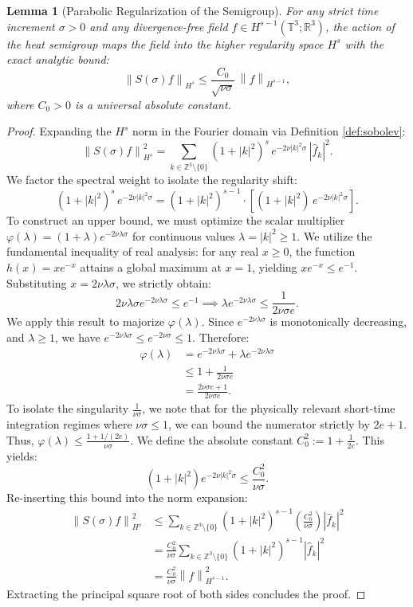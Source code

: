\documentclass[12pt,a4paper]{article}
\theoremstyle{plain}
\newtheorem{lemma}[theorem]{Lemma}
\theoremstyle{definition}
\theoremstyle{remark}
\newcommand{\T}{\mathbb{T}}
\newcommand{\Z}{\mathbb{Z}}
\newcommand{\R}{\mathbb{R}}
\newcommand{\norm}[1]{\left\|#1\right\|}
\begin{document}
\begin{lemma}[Parabolic Regularization of the Semigroup]
\label{lem:regul}
For any strict time increment $\sigma > 0$ and any divergence-free field $f\in H^{s-1}(\T^3;\R^3)$, the action of the heat semigroup maps the field into the higher regularity space $H^s$ with the exact analytic bound:
\[
  \norm{S(\sigma)f}_{H^s} \le \frac{C_0}{\sqrt{\nu\sigma}}\,\norm{f}_{H^{s-1}},
\]
where $C_0 > 0$ is a universal absolute constant.
\end{lemma}

\begin{proof}
Expanding the $H^s$ norm in the Fourier domain via Definition \ref{def:sobolev}:
\[
  \norm{S(\sigma)f}_{H^s}^2 = \sum_{k\in\Z^3\setminus\{0\}} (1+|k|^2)^s\,e^{-2\nu|k|^2\sigma}\,|\hat{f}_k|^2.
\]
We factor the spectral weight to isolate the regularity shift:
\[
  (1+|k|^2)^s\,e^{-2\nu|k|^2\sigma} = (1+|k|^2)^{s-1} \cdot \left[ (1+|k|^2)\,e^{-2\nu|k|^2\sigma} \right].
\]
To construct an upper bound, we must optimize the scalar multiplier $\varphi(\lambda) = (1+\lambda)e^{-2\nu\lambda\sigma}$ for continuous values $\lambda = |k|^2 \ge 1$.
We utilize the fundamental inequality of real analysis: for any real $x \ge 0$, the function $h(x) = x e^{-x}$ attains a global maximum at $x=1$, yielding $x e^{-x} \le e^{-1}$.
Substituting $x = 2\nu\lambda\sigma$, we strictly obtain:
\[
  2\nu\lambda\sigma e^{-2\nu\lambda\sigma} \le e^{-1} \implies \lambda e^{-2\nu\lambda\sigma} \le \frac{1}{2\nu\sigma e}.
\]
We apply this result to majorize $\varphi(\lambda)$. Since $e^{-2\nu\lambda\sigma}$ is monotonically decreasing, and $\lambda \ge 1$, we have $e^{-2\nu\lambda\sigma} \le e^{-2\nu\sigma} \le 1$. Therefore:
\begin{align*}
  \varphi(\lambda) &= e^{-2\nu\lambda\sigma} + \lambda e^{-2\nu\lambda\sigma} \\
  &\le 1 + \frac{1}{2\nu\sigma e} \\
  &= \frac{2\nu\sigma e + 1}{2\nu\sigma e}.
\end{align*}
To isolate the singularity $\frac{1}{\nu\sigma}$, we note that for the physically relevant short-time integration regimes where $\nu\sigma \le 1$, we can bound the numerator strictly by $2e + 1$. Thus, $\varphi(\lambda) \le \frac{1 + 1/(2e)}{\nu\sigma}$. We define the absolute constant $C_0^2 := 1 + \frac{1}{2e}$. This yields:
\[
  (1+|k|^2)e^{-2\nu|k|^2\sigma} \le \frac{C_0^2}{\nu\sigma}.
\]
Re-inserting this bound into the norm expansion:
\begin{align*}
  \norm{S(\sigma)f}_{H^s}^2
  &\le \sum_{k\in\Z^3\setminus\{0\}} (1+|k|^2)^{s-1} \left( \frac{C_0^2}{\nu\sigma} \right) |\hat{f}_k|^2 \\
  &= \frac{C_0^2}{\nu\sigma} \sum_{k\in\Z^3\setminus\{0\}} (1+|k|^2)^{s-1} |\hat{f}_k|^2 \\
  &= \frac{C_0^2}{\nu\sigma} \norm{f}_{H^{s-1}}^2.
\end{align*}
Extracting the principal square root of both sides concludes the proof.
\end{proof}
\end{document}
